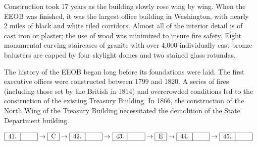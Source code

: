 \begin{listmatch}
\item 
Construction took 17 years as the building slowly rose wing by wing.
When the EEOB was finished, it was the largest office building in
Washington, with nearly 2 miles of black and white tiled corridors.
Almost all of the interior detail is of cast iron or plaster; the use of
wood was minimized to insure fire safety. Eight monumental curving
staircases of granite with over 4,000 individually cast bronze balusters
are capped by four skylight domes and two stained glass rotundas.


\item 
The history of the EEOB began long before its foundations were laid.
The first executive offices were constructed between 1799 and 1820. A
series of fires (including those set by the British in 1814) and
overcrowded conditions led to the construction of the existing Treasury
Building. In 1866, the construction of the North Wing of the Treasury
Building necessitated the demolition of the State Department building.

\end{listmatch}

\[ 
\begin{tabular}{|c|c|}
	\hline
	41. &  \hspace{1.5em} \\
	\hline
\end{tabular}
\rightarrow
\begin{tabular}{|c|}
	\hline
	C \\
	\hline
\end{tabular}
\rightarrow
\begin{tabular}{|c|c|}
	\hline
	42. &  \hspace{1.5em} \\
	\hline
\end{tabular}
\rightarrow
\begin{tabular}{|c|c|}
	\hline
	43. &  \hspace{1.5em} \\
	\hline
\end{tabular}
\rightarrow
\begin{tabular}{|c|}
	\hline
	E \\
	\hline
\end{tabular}
\rightarrow
\begin{tabular}{|c|c|}
	\hline
	44. &  \hspace{1.5em} \\
	\hline
\end{tabular}
\rightarrow
\begin{tabular}{|c|c|}
	\hline
	45. &  \hspace{1.5em} \\
	\hline
\end{tabular}
\]


